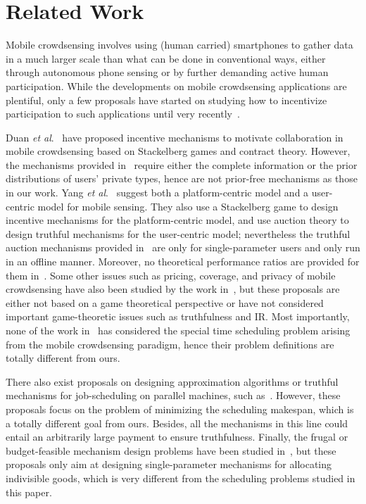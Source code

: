 \documentclass[10pt,journal,compsoc]{IEEEtran}
\begin{document}
\section{Related Work} \label{sec:rw}
Mobile crowdsensing involves using (human carried) smartphones to gather data in a much larger scale than what can be done in conventional ways, either through autonomous phone sensing or by further demanding active human participation\cite{GantiYL2011,Khan2013}. While the developments on mobile crowdsensing applications are plentiful, only a few proposals have started on studying how to incentivize participation to such applications until very recently~\cite{Lee2010,Jaimes2012,Duan2012,Yang2012,Qinghua2013}.

  Duan \textit{et al}.\ \cite{Duan2012} have proposed incentive mechanisms to motivate collaboration in mobile crowdsensing based on Stackelberg games and contract theory. However, the mechanisms provided in~\cite{Duan2012} require either the complete information or the prior distributions of users' private types, hence are not prior-free mechanisms as those in our work. Yang \textit{et al}.\ \cite{Yang2012} suggest both a platform-centric model and a user-centric model for mobile sensing. They also use a Stackelberg game to design incentive mechanisms for the platform-centric model, and use auction theory to design truthful mechanisms for the user-centric model; nevertheless the truthful auction mechanisms provided in~\cite{Yang2012} are only for single-parameter users and only run in an offline manner. Moreover, no theoretical performance ratios are provided for them in~\cite{Yang2012}.
Some other issues such as pricing, coverage, and privacy of mobile crowdsensing have also been studied by the work in~\cite{Lee2010,Jaimes2012,Qinghua2013}, but these proposals are either not based on a game theoretical perspective or have not considered important game-theoretic issues such as truthfulness and IR.
Most importantly, none of the work in~\cite{Lee2010,Jaimes2012,Duan2012,Yang2012,Qinghua2013} has considered the special time scheduling problem arising from the mobile crowdsensing paradigm, hence their problem definitions are totally different from ours.

  There also exist proposals on designing approximation algorithms or truthful mechanisms for job-scheduling on parallel machines, such as~\cite{Lenstra1990,Christodoulou2010,Dhangwatnotai2011,Koutsoupias2013}. However, these proposals focus on the problem of minimizing the scheduling makespan, which is a totally different goal from ours. Besides, all the mechanisms in this line could entail an arbitrarily large payment to ensure truthfulness. Finally, the frugal or budget-feasible mechanism design problems have been studied in~\cite{Karlin2005,Singer2010,Chen2011,Badanidiyuru2012}, but these proposals only aim at designing single-parameter mechanisms for allocating indivisible goods, which is very different from the scheduling problems studied in this paper.
\end{document}
